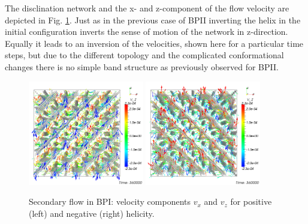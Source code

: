 \documentclass[aps,pre,twocolumn,groupedaddress]{revtex4-1}
\begin{document}
The disclination network and the x- and z-component of the flow velocity are depicted in Fig. \ref{fig7}.
Just as in the previous case of BPII inverting the helix in the initial configuration inverts the sense of motion of the network in z-direction.
Equally it leads to an inversion of the velocities, shown here for a particular time steps, but due to the different topology and the complicated conformational changes there is no simple band structure as previously observed for BPII. 

\begin{figure}[h]
\includegraphics[width=0.45\textwidth]{v_xz-v_z-360k_run914.png}
\includegraphics[width=0.45\textwidth]{v_xz-v_z-360k_run922.png}
\caption{Secondary flow in BPI: velocity components $v_x$ and $v_z$ for positive (left) and negative (right) helicity.}
\label{fig7}
\end{figure}
\end{document}

